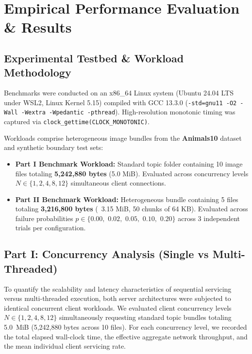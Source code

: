\documentclass[11pt,a4paper]{article}
\begin{document}
\section{Empirical Performance Evaluation \& Results}

\subsection{Experimental Testbed \& Workload Methodology}
Benchmarks were conducted on an x86\_64 Linux system (Ubuntu 24.04 LTS under WSL2, Linux Kernel 5.15) compiled with GCC 13.3.0 (\texttt{-std=gnu11 -O2 -Wall -Wextra -Wpedantic -pthread}). High-resolution monotonic timing was captured via \texttt{clock\_gettime(CLOCK\_MONOTONIC)}.

Workloads comprise heterogeneous image bundles from the \textbf{Animals10} dataset and synthetic boundary test sets:
\begin{itemize}
    \item \textbf{Part I Benchmark Workload:} Standard topic folder containing 10 image files totaling \textbf{5,242,880 bytes} (5.0 MiB). Evaluated across concurrency levels $N \in \{1, 2, 4, 8, 12\}$ simultaneous client connections.
    \item \textbf{Part II Benchmark Workload:} Heterogeneous bundle containing 5 files totaling \textbf{3,216,800 bytes} (~3.15 MiB, 50 chunks of 64 KB). Evaluated across failure probabilities $p \in \{0.00,$ $0.02,$ $0.05,$ $0.10,$ $0.20\}$ across 3 independent trials per configuration.
\end{itemize}

\subsection{Part I: Concurrency Analysis (Single vs Multi-Threaded)}

To quantify the scalability and latency characteristics of sequential servicing versus multi-threaded execution, both server architectures were subjected to identical concurrent client workloads. We evaluated client concurrency levels $N \in \{1, 2, 4, 8, 12\}$ simultaneously requesting standard topic bundles totaling 5.0~MiB (5,242,880 bytes across 10 files). For each concurrency level, we recorded the total elapsed wall-clock time, the effective aggregate network throughput, and the mean individual client servicing rate.
\end{document}
